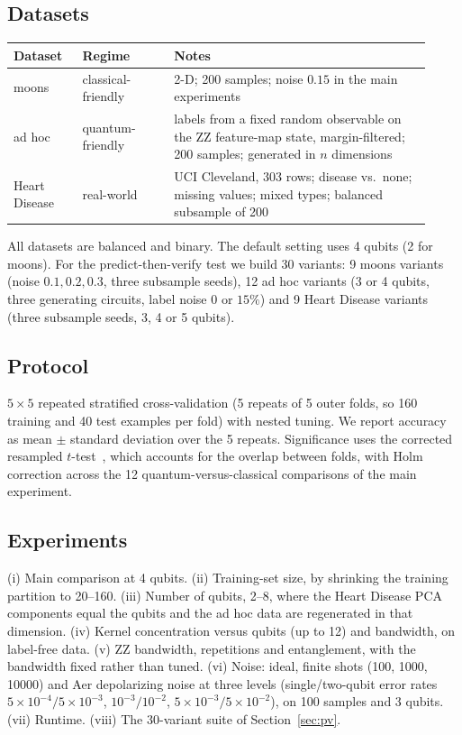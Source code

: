 \documentclass[11pt,a4paper]{article}
\begin{document}
\subsection{Datasets}\label{sec:datasets}
\begin{table}[h]\centering
\begin{tabular}{p{0.15\linewidth}p{0.2\linewidth}p{0.57\linewidth}}\toprule
Dataset & Regime & Notes\\\midrule
moons & classical-friendly & 2-D; 200 samples; noise $0.15$ in the main experiments\\
ad hoc & quantum-friendly & labels from a fixed random observable on the ZZ feature-map state, margin-filtered; 200 samples; generated in $n$ dimensions\\
Heart Disease & real-world & UCI Cleveland, 303 rows; disease vs.\ none; missing values; mixed types; balanced subsample of 200\\\bottomrule
\end{tabular}\end{table}
All datasets are balanced and binary. The default setting uses 4 qubits (2 for moons). For the predict-then-verify test we build 30 variants: 9 moons variants (noise $0.1,0.2,0.3$, three subsample seeds), 12 ad hoc variants (3 or 4 qubits, three generating circuits, label noise $0$ or $15\%$) and 9 Heart Disease variants (three subsample seeds, 3, 4 or 5 qubits).

\subsection{Protocol}
$5\times5$ repeated stratified cross-validation (5 repeats of 5 outer folds, so 160 training and 40 test examples per fold) with nested tuning. We report accuracy as mean $\pm$ standard deviation over the 5 repeats. Significance uses the corrected resampled $t$-test~\cite{nadeau2003}, which accounts for the overlap between folds, with Holm correction across the 12 quantum-versus-classical comparisons of the main experiment.

\subsection{Experiments}
(i) Main comparison at 4 qubits. (ii) Training-set size, by shrinking the training partition to 20--160. (iii) Number of qubits, 2--8, where the Heart Disease PCA components equal the qubits and the ad hoc data are regenerated in that dimension. (iv) Kernel concentration versus qubits (up to 12) and bandwidth, on label-free data. (v) ZZ bandwidth, repetitions and entanglement, with the bandwidth fixed rather than tuned. (vi) Noise: ideal, finite shots (100, 1000, 10000) and Aer depolarizing noise at three levels (single/two-qubit error rates $5\!\times\!10^{-4}/5\!\times\!10^{-3}$, $10^{-3}/10^{-2}$, $5\!\times\!10^{-3}/5\!\times\!10^{-2}$), on 100 samples and 3 qubits. (vii) Runtime. (viii) The 30-variant suite of Section~\ref{sec:pv}.
\end{document}

